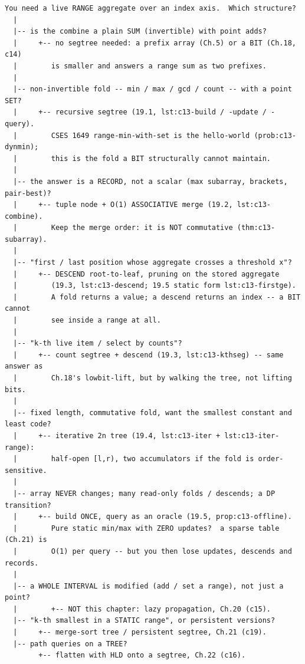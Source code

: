 \begin{lstlisting}[language={}, basicstyle=\ttfamily\small, numbers=none, frame=single]
  You need a live RANGE aggregate over an index axis.  Which structure?
  |
  |-- is the combine a plain SUM (invertible) with point adds?
  |     +-- no segtree needed: a prefix array (Ch.5) or a BIT (Ch.18, c14)
  |        is smaller and answers a range sum as two prefixes.
  |
  |-- non-invertible fold -- min / max / gcd / count -- with a point SET?
  |     +-- recursive segtree (19.1, lst:c13-build / -update / -query).
  |        CSES 1649 range-min-with-set is the hello-world (prob:c13-dynmin);
  |        this is the fold a BIT structurally cannot maintain.
  |
  |-- the answer is a RECORD, not a scalar (max subarray, brackets, pair-best)?
  |     +-- tuple node + O(1) ASSOCIATIVE merge (19.2, lst:c13-combine).
  |        Keep the merge order: it is NOT commutative (thm:c13-subarray).
  |
  |-- "first / last position whose aggregate crosses a threshold x"?
  |     +-- DESCEND root-to-leaf, pruning on the stored aggregate
  |        (19.3, lst:c13-descend; 19.5 static form lst:c13-firstge).
  |        A fold returns a value; a descend returns an index -- a BIT cannot
  |        see inside a range at all.
  |
  |-- "k-th live item / select by counts"?
  |     +-- count segtree + descend (19.3, lst:c13-kthseg) -- same answer as
  |        Ch.18's lowbit-lift, but by walking the tree, not lifting bits.
  |
  |-- fixed length, commutative fold, want the smallest constant and least code?
  |     +-- iterative 2n tree (19.4, lst:c13-iter + lst:c13-iter-range):
  |        half-open [l,r), two accumulators if the fold is order-sensitive.
  |
  |-- array NEVER changes; many read-only folds / descends; a DP transition?
  |     +-- build ONCE, query as an oracle (19.5, prop:c13-offline).
  |        Pure static min/max with ZERO updates?  a sparse table (Ch.21) is
  |        O(1) per query -- but you then lose updates, descends and records.
  |
  |-- a WHOLE INTERVAL is modified (add / set a range), not just a point?
  |        +-- NOT this chapter: lazy propagation, Ch.20 (c15).
  |-- "k-th smallest in a STATIC range", or persistent versions?
  |     +-- merge-sort tree / persistent segtree, Ch.21 (c19).
  |-- path queries on a TREE?
        +-- flatten with HLD onto a segtree, Ch.22 (c16).
\end{lstlisting}


